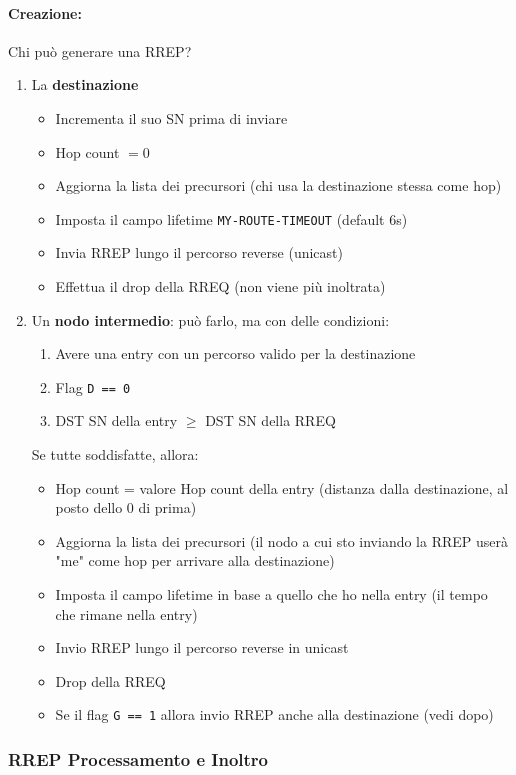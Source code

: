 \paragraph{Creazione:} Chi può generare una RREP?
\begin{enumerate}
	\item La \textbf{destinazione}
	\begin{itemize}
		\item Incrementa il suo SN prima di inviare
		\item Hop count $= 0$
		\item Aggiorna la lista dei precursori (chi usa la destinazione stessa come hop)
		\item Imposta il campo lifetime \texttt{MY-ROUTE-TIMEOUT} (default 6s)
		\item Invia RREP lungo il percorso reverse (unicast)
		\item Effettua il drop della RREQ (non viene più inoltrata)
	\end{itemize}
	
	\item Un \textbf{nodo intermedio}: può farlo, ma con delle condizioni:
	\begin{enumerate}
		\item Avere una entry con un percorso valido per la destinazione
		\item Flag \texttt{D == 0}
		\item DST SN della entry $\geq$ DST SN della RREQ
	\end{enumerate}
	Se tutte soddisfatte, allora:
	\begin{itemize}
		\item Hop count = valore Hop count della entry (distanza dalla destinazione, al posto dello 0 di prima)
		\item Aggiorna la lista dei precursori (il nodo a cui sto inviando la RREP userà "me" come hop per arrivare alla destinazione)
		\item Imposta il campo lifetime in base a quello che ho nella entry (il tempo che rimane nella entry)
		\item Invio RREP lungo il percorso reverse in unicast
		\item Drop della RREQ
		\item Se il flag \texttt{G == 1} allora invio RREP anche alla destinazione (vedi dopo)
	\end{itemize}
\end{enumerate}

\subsubsection{RREP Processamento e Inoltro}

